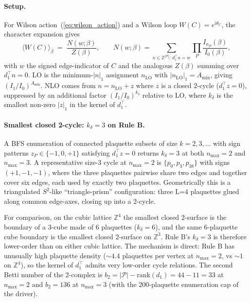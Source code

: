 \documentclass[11pt]{article}
\begin{document}
\paragraph{Setup.} For Wilson action~(\ref{eq:wilson_action}) and a Wilson
loop $W(C)=e^{i\theta_C}$, the character expansion gives
\begin{equation}
\langle W(C)\rangle_\beta\;=\;\frac{N(w;\beta)}{Z(\beta)},
\qquad
N(w;\beta)=\!\!\sum_{n\in\mathbb{Z}^{|\mathcal{P}|}:\,d_1^\top n=w}\!\prod_P\frac{I_{n_P}(\beta)}{I_0(\beta)},
\end{equation}
with $w$ the signed edge-indicator of $C$ and the analogous $Z(\beta)$ summing
over $d_1^\top n=0$. LO is the minimum-$|n|_1$ assignment $n_\text{LO}$ with
$|n_\text{LO}|_1=A_\text{min}$, giving $(I_1/I_0)^{A_\text{min}}$. NLO comes
from $n=n_\text{LO}+z$ where $z$ is a closed 2-cycle ($d_1^\top z=0$),
suppressed by an additional factor $(I_1/I_0)^{k_\delta}$ relative to LO,
where $k_\delta$ is the smallest non-zero $|z|_1$ in the kernel of $d_1^\top$.

\paragraph{Smallest closed 2-cycle: $k_\delta=3$ on Rule B.} A BFS enumeration
of connected plaquette subsets of size $k=2,3,\ldots$ with sign patterns
$z_P\in\{-1,0,+1\}$ satisfying $d_1^\top z=0$ returns $k_\delta=3$ at both
$n_\text{max}=2$ and $n_\text{max}=3$. A representative size-3 cycle at
$n_\text{max}=2$ is $\{p_0,p_3,p_{38}\}$ with signs $(+1,-1,-1)$, where the
three plaquettes pairwise share two edges and together cover six edges, each
used by exactly two plaquettes. Geometrically this is a triangulated $S^2$-like
``triangle-prism'' configuration: three L=4 plaquettes glued along common
edge-axes, closing up into a 2-cycle.

For comparison, on the cubic lattice $\mathbb{Z}^4$ the smallest closed
2-surface is the boundary of a 3-cube made of 6 plaquettes ($k_\delta=6$),
and the same 6-plaquette cube boundary is the smallest closed 2-surface on
$\mathbb{Z}^3$. Rule B's $k_\delta=3$ is therefore lower-order than on either
cubic lattice. The mechanism is direct:
Rule B has unusually high plaquette density ($\sim 4.4$ plaquettes per vertex
at $n_\text{max}=2$, vs $\sim 1$ on $\mathbb{Z}^4$), so the kernel of
$d_1^\top$ admits very low-order cycle relations. The second Betti number of
the 2-complex is $b_2=|\mathcal{P}|-\mathrm{rank}(d_1)=44-11=33$ at
$n_\text{max}=2$ and $b_2=136$ at $n_\text{max}=3$ (with the 200-plaquette
enumeration cap of the driver).
\end{document}
